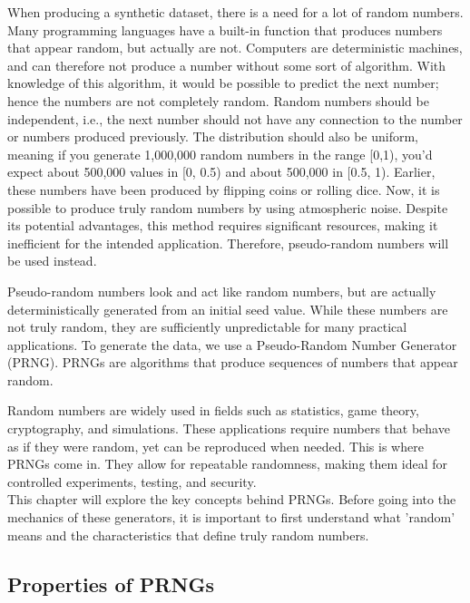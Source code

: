 When producing a synthetic dataset, there is a need for a lot of random numbers. Many programming languages have a built-in function that produces numbers that appear random, but actually are not. Computers are deterministic machines, and can therefore not produce a number without some sort of algorithm. With knowledge of this algorithm, it would be possible to predict the next number; hence the numbers are not completely random. Random numbers should be independent, i.e., the next number should not have any connection to the number or numbers produced previously. The distribution should also be uniform, meaning if you generate 1,000,000 random numbers in the range [0,1), you'd expect about 500,000 values in [0, 0.5) and about 500,000 in [0.5, 1). Earlier, these numbers have been produced by flipping coins or rolling dice. Now, it is possible to produce truly random numbers by using atmospheric noise. Despite its potential advantages, this method requires significant resources, making it inefficient for the intended application. Therefore, pseudo-random numbers will be used instead.

Pseudo-random numbers look and act like random numbers, but are actually deterministically generated from an initial seed value. While
these numbers are not truly random, they are sufficiently unpredictable for many practical applications.
To generate the data, we use a Pseudo-Random Number Generator (PRNG).
PRNGs are algorithms that produce sequences of numbers that appear random.


Random numbers are widely used in fields such as statistics, game theory, cryptography, and simulations. These applications require numbers that behave
as if they were random, yet can be reproduced when needed. This is where
PRNGs come in. They allow for repeatable randomness, making them ideal for
controlled experiments, testing, and security.
\\
This chapter will explore the key concepts behind PRNGs. Before going into the
mechanics of these generators, it is important to first understand what ’random’
means and the characteristics that define truly random numbers.

\subsection{Properties of PRNGs}

